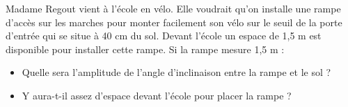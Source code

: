 %
%
    Madame Regout vient à l'école en vélo. Elle voudrait qu'on installe une rampe d'accès sur les marches pour monter facilement son vélo sur le seuil de la porte d'entrée qui se situe à 40 cm du sol. Devant l'école un espace de 1,5 m est disponible pour installer cette rampe. Si la rampe mesure 1,5 m :
    \begin{itemize}
        \item Quelle sera l'amplitude de l'angle d'inclinaison entre la rampe et le sol ?
        \item Y aura-t-il assez d'espace devant l'école pour placer la rampe ?
    \end{itemize}
